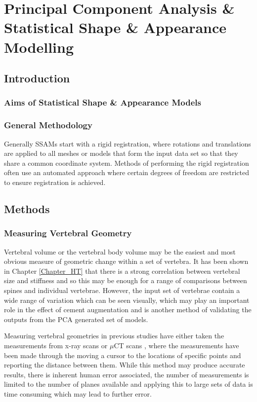 \chapter{Principal Component Analysis \& Statistical Shape \& Appearance Modelling}\label{PCA_CHAP}


\section{Introduction}

\subsection{Aims of Statistical Shape \& Appearance Models}

\subsection{General Methodology}

Generally SSAMs start with a rigid registration, where rotations and translations are applied to all meshes or models that form the input data set so that they share a common coordinate system.
Methods of performing the rigid registration often use an automated approach where certain degrees of freedom are restricted to ensure registration is achieved.



\section{Methods}

\subsection{Measuring Vertebral Geometry}

Vertebral volume or the vertebral body volume may be the easiest and most obvious measure of geometric change within a set of vertebra.
It has been shown in Chapter \ref{Chapter_HT} that there is a strong correlation between vertebral size and stiffness and so this may be enough for a range of comparisons between spines and individual vertebrae.
However, the input set of vertebrae contain a wide range of variation which can be seen visually, which may play an important role in the effect of cement augmentation and is another method of validating the outputs from the PCA generated set of models.

Measuring vertebral geometries in previous studies have either taken the measurements from x-ray scans \cite{Gilad1986,Gilad1985} or $\mu$CT scans \cite{Zhou2000,Cheung1994}, where the measurements have been made through the moving a cursor to the locations of specific points and reporting the distance between them.
While this method may produce accurate results, there is inherent human error associated, the number of measurements is limited to the number of planes available and applying this to large sets of data is time consuming which may lead to further error.

